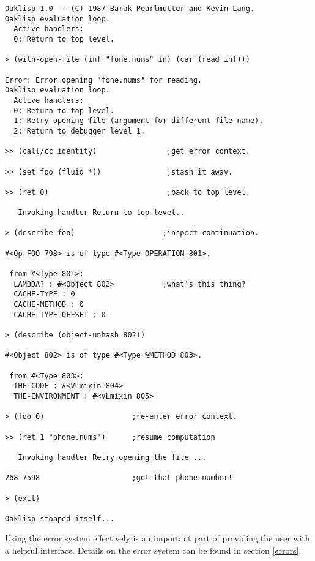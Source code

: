 \begin{verbatim}
Oaklisp 1.0  - (C) 1987 Barak Pearlmutter and Kevin Lang.
Oaklisp evaluation loop.
  Active handlers:
  0: Return to top level.

> (with-open-file (inf "fone.nums" in) (car (read inf)))

Error: Error opening "fone.nums" for reading.
Oaklisp evaluation loop.
  Active handlers:
  0: Return to top level.
  1: Retry opening file (argument for different file name).
  2: Return to debugger level 1.

>> (call/cc identity)                ;get error context.

>> (set foo (fluid *))               ;stash it away.

>> (ret 0)                           ;back to top level.

   Invoking handler Return to top level..

> (describe foo)                    ;inspect continuation.

#<Op FOO 798> is of type #<Type OPERATION 801>.

 from #<Type 801>:
  LAMBDA? : #<Object 802>           ;what's this thing?
  CACHE-TYPE : 0
  CACHE-METHOD : 0
  CACHE-TYPE-OFFSET : 0

> (describe (object-unhash 802))

#<Object 802> is of type #<Type %METHOD 803>.

 from #<Type 803>:
  THE-CODE : #<VLmixin 804>
  THE-ENVIRONMENT : #<VLmixin 805>

> (foo 0)                    ;re-enter error context.

>> (ret 1 "phone.nums")      ;resume computation

   Invoking handler Retry opening the file ...

268-7598                     ;got that phone number!

> (exit)

Oaklisp stopped itself...
\end{verbatim}

Using the error system effectively is an important part of providing
the user with a helpful interface.  Details on the error system can be
found in section \ref{errors}.
